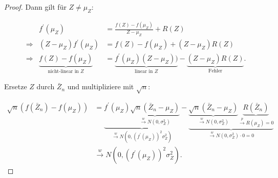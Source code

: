 \documentclass{tstextbook}
\begin{document}
\begin{proof}
	Dann gilt für $ Z \ne \mu_Z $: 
	
	\[
	\begin{aligned}
		&& f^\prime(\mu_Z) & = \frac{f(Z)-f(\mu_Z)}{Z-\mu_Z} + R(Z) \\
		&\Rightarrow & (Z-\mu_Z)f^\prime(\mu_Z) & = f(Z)-f(\mu_Z) + (Z-\mu_Z) R(Z) \\
		&\Rightarrow & \underbrace{f(Z)-f(\mu_Z)}_{\text{nicht-linear in } Z} & = \underbrace{f^\prime(\mu_Z)(Z-\mu_Z))}_{\text{linear in } Z} - \underbrace{(Z-\mu_Z)R(Z)}_{\text{Fehler}}.
	\end{aligned}
	\]
	
	Ersetze $ Z $ durch $ \bar{Z}_n $ und multipliziere mit $ \sqrt{n} $: 
	
	\[
	\begin{aligned}
		\sqrt{n} \left(f(\bar{Z}_n)-f(\mu_Z)\right) & = \underbrace{f^\prime(\mu_Z)\underbrace{\sqrt{n}\left(\bar{Z}_n-\mu_Z\right)}_{\xrightarrow{w}N(0,\sigma_Z^2)}}_{\xrightarrow{w}N\left(0,(f^\prime(\mu_Z))^2\sigma_Z^2\right)} - \underbrace{\underbrace{\sqrt{n}(\bar{Z}_n-\mu_Z)}_{\xrightarrow{w}N(0,\sigma_Z^2)}\underbrace{R(\bar{Z}_n)}_{\xrightarrow{p}R(\mu_Z)=0}}_{\xrightarrow{w}N(0,\sigma_Z^2)\cdot 0 = 0} \\
		&  \xrightarrow{w} N\left(0, (f^\prime(\mu_Z))^2\sigma_Z^2\right).
	\end{aligned}
	\]
	
\end{proof}
\end{document}
